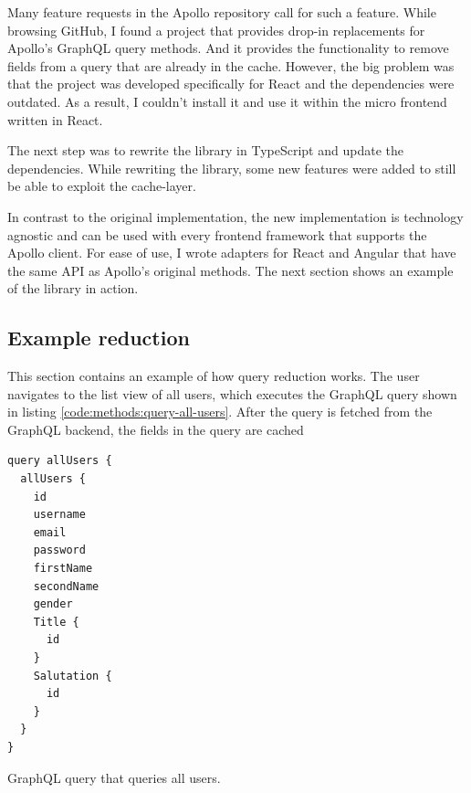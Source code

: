 \fi

Many feature requests in the Apollo repository call for such a feature. While browsing GitHub, I found a project that provides drop-in replacements for Apollo's GraphQL query methods. And it provides the functionality to remove fields from a query that are already in the cache. However, the big problem was that the project was developed specifically for React and the dependencies were outdated. As a result, I couldn't install it and use it within the micro frontend written in React.

The next step was to rewrite the library in TypeScript and update the dependencies. While rewriting the library, some new features were added to still be able to exploit the cache-layer.


In contrast to the original implementation, the new implementation is technology agnostic and can be used with every frontend framework that supports the Apollo client. For ease of use, I wrote adapters for React and Angular that have the same API as Apollo's original methods. The next section shows an example of the library in action.

\subsection{Example reduction}

This section contains an example of how query reduction works. The user navigates to the list view of all users, which executes the GraphQL query shown in listing \ref{code:methods:query-all-users}. After the query is fetched from the GraphQL backend, the fields in the query are cached

\ifshowListings
\begin{listing}[H]
\begin{verbatim}
query allUsers {
  allUsers {
    id
    username
    email
    password
    firstName
    secondName
    gender
    Title {
      id
    }
    Salutation {
      id
    }
  }
}
\end{verbatim}
\caption{GraphQL query that queries all users.}\label{code:methods:query-all-users}
\end{listing}
\fi

